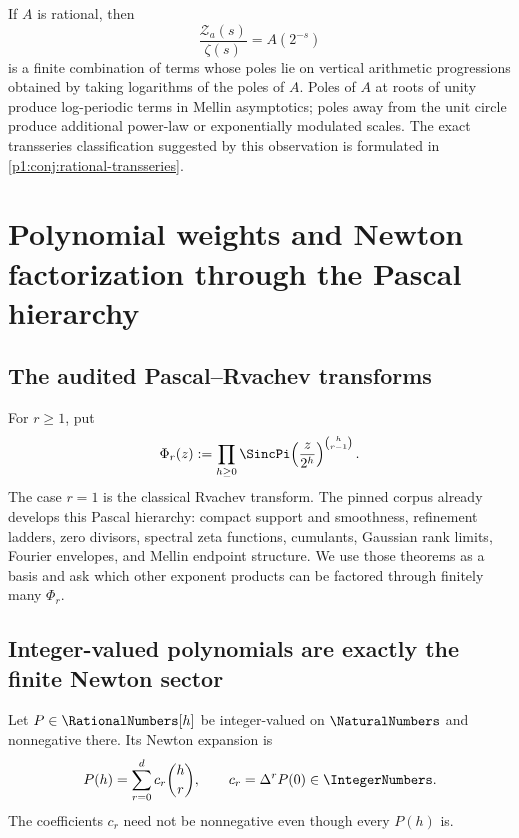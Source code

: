 \documentclass[11pt,oneside]{article}
\numberwithin{equation}{section}
\theoremstyle{definition}
\theoremstyle{remark}
\newcommand{\Zspec}{\mathcal Z}
\begin{document}
\begin{corollary}
\label{p1:cor:rational-poles}
If $A$ is rational, then
\begin{equation}
 \frac{\Zspec_a(s)}{\zeta(s)}=A(2^{-s})
 \label{p1:eq:rational-zeta-quotient}
\end{equation}
is a finite combination of terms whose poles lie on vertical arithmetic progressions
obtained by taking logarithms of the poles of $A$.  Poles of $A$ at roots of unity produce
log-periodic terms in Mellin asymptotics; poles away from the unit circle produce additional
power-law or exponentially modulated scales.  The exact transseries classification suggested
by this observation is formulated in \cref{p1:conj:rational-transseries}.
\end{corollary}


\section{Polynomial weights and Newton factorization through the Pascal hierarchy}
\label{p1:sec:newton}

\subsection{The audited Pascal--Rvachev transforms}

For $r\ge1$, put
\begin{equation}
 \Phi_r(z)
 :=\prod_{h\ge0}\SincPi\!\left(\frac z{2^h}\right)^{\binom h{r-1}}.
 \label{p1:eq:pascal-transform}
\end{equation}
The case $r=1$ is the classical Rvachev transform.  The pinned corpus already develops this
Pascal hierarchy: compact support and smoothness, refinement ladders, zero divisors, spectral
zeta functions, cumulants, Gaussian rank limits, Fourier envelopes, and Mellin endpoint
structure.  We use those theorems as a basis and ask which other exponent products can be
factored through finitely many $\Phi_r$.

\subsection{Integer-valued polynomials are exactly the finite Newton sector}

Let $P\in\RationalNumbers[h]$ be integer-valued on $\NaturalNumbers$ and nonnegative there.  Its Newton expansion is
\begin{equation}
 P(h)=\sum_{r=0}^{d}c_r\binom hr,
 \qquad
 c_r=\Delta^rP(0)\in\IntegerNumbers.
 \label{p1:eq:newton-expansion}
\end{equation}
The coefficients $c_r$ need not be nonnegative even though every $P(h)$ is.
\end{document}
